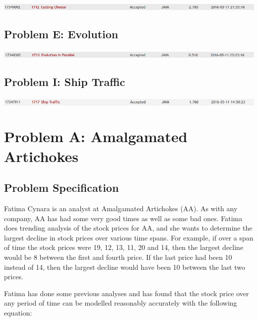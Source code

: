 \documentclass[12pt]{article}
\begin{document}
\begin{center}
    \includegraphics[width=\textwidth]{cheese_result}
\end{center}

\subsection{Problem E: Evolution}

\begin{center}
    \includegraphics[width=\textwidth]{evolution_result}
\end{center}

\subsection{Problem I: Ship Traffic}

\begin{center}
    \includegraphics[width=\textwidth]{ships_result}
\end{center}

\newpage

\section{Problem A: Amalgamated Artichokes}

\subsection{Problem Specification}

Fatima Cynara is an analyst at Amalgamated Artichokes (AA). As with
any company, AA has had some very good times as well as some bad ones.
Fatima does trending analysis of the stock prices for AA, and she
wants to determine the largest decline in stock prices over various time
spans. For example, if over a span of time the stock prices were
19, 12, 13, 11, 20 and 14, then the largest decline would be 8
between the first and fourth price. If the last price had been 10
instead of 14, then the largest decline would have been 10 between
the last two prices.

Fatima has done some previous analyses and has found that the
stock price over any period of time can be modelled reasonably
accurately with the following equation:
\end{document}
